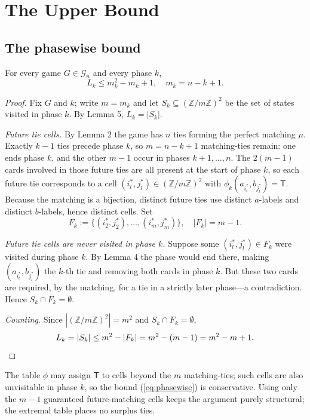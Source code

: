 \documentclass[12pt]{article}
\newcommand{\TT}{\mathsf{T}}
\begin{document}
\section{The Upper Bound}\label{sec:upper}
\subsection{The phasewise bound}
\begin{theorem}\label{thm:phasewise}
For every game $G\in\mathcal{G}_n$ and every phase $k$,
\begin{equation}\label{eq:phasewise}
L_k\le m_k^2-m_k+1, \quad m_k=n-k+1.
\end{equation}
\end{theorem}
\begin{proof}
Fix $G$ and $k$; write $m=m_k$ and let $S_k\subseteq(\mathbb{Z}/m\mathbb{Z})^2$ be the set of states visited in phase $k$. By Lemma 5, $L_k=|S_k|$.

\emph{Future tie cells.} By Lemma 2 the game has $n$ ties forming the perfect matching $\mu$. Exactly $k-1$ ties precede phase $k$, so $m=n-k+1$ matching-ties remain: one ends phase $k$, and the other $m-1$ occur in phases $k+1,\dots,n$. The $2(m-1)$ cards involved in those future ties are all present at the start of phase $k$, so each future tie corresponds to a cell $(i_l^*,j_l^*)\in(\mathbb{Z}/m\mathbb{Z})^2$ with $\phi_k(a_{i_l^*},b_{j_l^*})=\TT$. Because the matching is a bijection, distinct future ties use distinct $a$-labels and distinct $b$-labels, hence distinct cells. Set
\begin{equation}
F_k:=\{(i_2^*,j_2^*),\dots,(i_m^*,j_m^*)\}, \quad |F_k|=m-1.
\end{equation}

\emph{Future tie cells are never visited in phase $k$.} Suppose some $(i_l^*,j_l^*)\in F_k$ were visited during phase $k$. By Lemma 4 the phase would end there, making $(a_{i_l^*},b_{j_l^*})$ the $k$-th tie and removing both cards in phase $k$. But these two cards are required, by the matching, for a tie in a strictly later phase---a contradiction. Hence $S_k\cap F_k=\emptyset$.

\emph{Counting.} Since $|(\mathbb{Z}/m\mathbb{Z})^2|=m^2$ and $S_k\cap F_k=\emptyset$,
\[
L_k = |S_k| \le m^2 - |F_k| = m^2 - (m-1) = m^2 - m + 1. \qedhere
\]
\end{proof}

\begin{remark} The table $\phi$ may assign $\TT$ to cells beyond the $m$ matching-ties; such cells are also unvisitable in phase $k$, so the bound (\ref{eq:phasewise}) is conservative. Using only the $m-1$ guaranteed future-matching cells keeps the argument purely structural; the extremal table places no surplus ties.
\end{remark}
\end{document}
